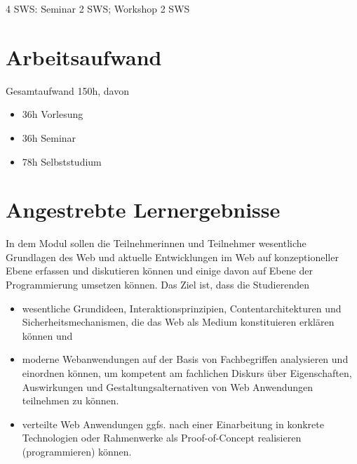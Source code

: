 4 SWS: Seminar 2 SWS; Workshop 2 SWS

\hypertarget{arbeitsaufwandpathlabel....srcmodulbeschreibungen-bachelor-bpo5ba_web-development}{%
\section*{Arbeitsaufwand\label{../../src/modulbeschreibungen-bachelor-bpo5/BA_Web-Development}}\label{arbeitsaufwandpathlabel....srcmodulbeschreibungen-bachelor-bpo5ba_web-development}}

Gesamtaufwand 150h, davon

\begin{itemize}
\tightlist
\item
  36h Vorlesung
\item
  36h Seminar
\item
  78h Selbststudium
\end{itemize}

\hypertarget{angestrebte-lernergebnissepathlabel....srcmodulbeschreibungen-bachelor-bpo5ba_web-development}{%
\section*{Angestrebte
Lernergebnisse\label{../../src/modulbeschreibungen-bachelor-bpo5/BA_Web-Development}}\label{angestrebte-lernergebnissepathlabel....srcmodulbeschreibungen-bachelor-bpo5ba_web-development}}

In dem Modul sollen die Teilnehmerinnen und Teilnehmer wesentliche
Grundlagen des Web und aktuelle Entwicklungen im Web auf konzeptioneller
Ebene erfassen und diskutieren können und einige davon auf Ebene der
Programmierung umsetzen können. Das Ziel ist, dass die Studierenden

\begin{itemize}
\tightlist
\item
  wesentliche Grundideen, Interaktionsprinzipien, Contentarchitekturen
  und Sicherheitsmechanismen, die das Web als Medium konstituieren
  erklären können und
\item
  moderne Webanwendungen auf der Basis von Fachbegriffen analysieren und
  einordnen können, um kompetent am fachlichen Diskurs über
  Eigenschaften, Auswirkungen und Gestaltungsalternativen von Web
  Anwendungen teilnehmen zu können.
\item
  verteilte Web Anwendungen ggfs. nach einer Einarbeitung in konkrete
  Technologien oder Rahmenwerke als Proof-of-Concept realisieren
  (programmieren) können.
\end{itemize}

